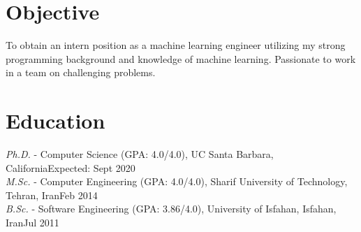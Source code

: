 \documentclass[letter]{res}
\begin{document}
	\newif \iflong
	\longtrue     %
	
	\address{+1 (805) 886 7101 ~~~ 6520 El Colegio Rd, Apt 2308, Santa Barbara, CA 93106. ~~~ \href{mailto:omid55@cs.ucsb.edu}{omid55@cs.ucsb.edu} ~~~ \href{https://github.com/omid55/}{Github} ~~~ \href{https://www.linkedin.com/in/omid-askarisichani-07bb5230}{LinkedIn}}
	\begin{resume}
		\noindent\makebox[\linewidth]{\rule{\paperwidth}{0.4pt}}
		
		
		\section{Objective}
		To obtain an intern position as a machine learning engineer utilizing my strong programming background and knowledge of machine learning. Passionate to work in a team on challenging problems.
		
		
		\section{Education}
		{\sl Ph.D.} - Computer Science (GPA: 4.0/4.0), UC Santa Barbara, California\hfill Expected: Sept 2020\vspace{-1mm}\\
		{\sl M.Sc.} - Computer Engineering (GPA: 4.0/4.0), Sharif University of Technology, Tehran, Iran\hfill Feb 2014\vspace{-1mm}\\
		{\sl B.Sc.} - Software Engineering (GPA: 3.86/4.0), University of Isfahan, Isfahan, Iran\hfill Jul 2011\vspace{-1mm}
		
		

\end{resume}
\end{document}
